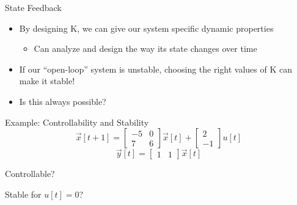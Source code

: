 \begin{frame}{State Feedback}
    \begin{itemize}
        \item 
By designing K, we can give our system specific dynamic properties
            \begin{itemize}
        \item 
Can analyze and design the way its state changes over time
            \end{itemize}
        \item 
If our “open-loop” system is unstable, choosing the right values of K can make it stable!
        \item 
Is this always possible?
    \end{itemize}
\end{frame}

\begin{frame}{Example: Controllability and Stability}
    \[
        \vec x[t + 1] = \begin{bmatrix}
            -5 & 0 \\
            7 & 6
            \end{bmatrix} \vec x[t] +  \begin{bmatrix} 2 \\ -1\end{bmatrix} u[t]
    \]
    \[
        \vec y[t] = \begin{bmatrix} 1 & 1 \end{bmatrix} \vec x[t]
   \]

   Controllable? 
   
    Stable for \(u[t] = 0\)?
\end{frame}

